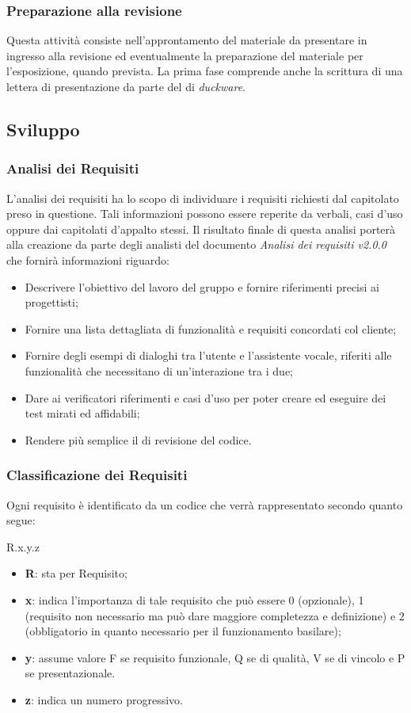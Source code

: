 \subsubsection{Preparazione alla revisione}
Questa attività consiste nell'approntamento del materiale da presentare in ingresso alla revisione ed eventualmente la preparazione del materiale per l'esposizione, quando prevista. La prima fase comprende anche la scrittura di una lettera di presentazione da parte del  di \emph{duckware}.
\subsection{Sviluppo}
\label{sec:sviluppo}
\subsubsection{Analisi dei Requisiti}
L’analisi dei requisiti ha lo scopo di individuare i requisiti richiesti dal capitolato preso in questione. Tali informazioni possono essere reperite da verbali, casi d’uso oppure dai capitolati d’appalto stessi. Il risultato finale di questa analisi porterà alla creazione da parte degli analisti del documento \emph{Analisi dei requisiti v2.0.0} che fornirà informazioni riguardo:
\begin{itemize}
	\item Descrivere l’obiettivo del lavoro del gruppo e fornire riferimenti precisi ai progettisti;
	\item Fornire una lista dettagliata di funzionalità e requisiti concordati col  cliente;
	\item Fornire degli esempi di dialoghi tra l'utente e l'assistente vocale, riferiti alle funzionalità che necessitano di un'interazione tra i due;
	\item Dare ai verificatori riferimenti e casi d’uso per poter creare ed eseguire dei test mirati ed affidabili;
	\item Rendere più semplice il  di revisione del codice.
\end{itemize}
\subsubsection{Classificazione dei Requisiti}
Ogni requisito è identificato da un codice che verrà rappresentato secondo quanto segue:
\begin{center}
	R.{x}.{y}.{z}
\end{center}
\begin{itemize}
	\item \textbf{R}: sta per Requisito;
	\item \textbf{x}: indica l’importanza di tale requisito che può essere 0 (opzionale), 1 (requisito non necessario ma può dare maggiore completezza e definizione) e 2 (obbligatorio in quanto necessario per il funzionamento basilare);
	\item \textbf{y}: assume valore F se requisito funzionale, Q se di qualità, V se di vincolo e P se presentazionale.
	\item \textbf{z}: indica un numero progressivo.
\end{itemize}
